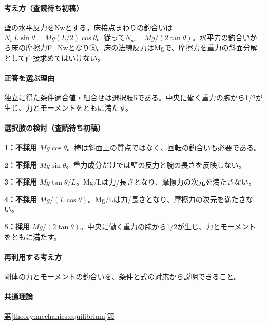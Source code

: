 \paragraph{考え方（査読待ち初稿）} 壁の水平反力をNwとする。床接点まわりの釣合いは\(N_wL\sin\theta=Mg(L/2)\cos\theta\)。従って\(N_w=Mg/(2\tan\theta)\)。水平力の釣合いから床の摩擦力F=\allowbreak{}Nwとなり⑤。床の法線反力はMgで、摩擦力を重力の斜面分解として直接求めてはいけない。

\paragraph{正答を選ぶ理由} 独立に得た条件適合値・組合せは選択肢5である。中央に働く重力の腕から1/2が生じ、力とモーメントをともに満たす。

\paragraph{選択肢の検討（査読待ち初稿）}\mbox{}\par

\noindent\textbf{1：不採用} \(Mg\cos\theta\)。棒は斜面上の質点ではなく、回転の釣合いも必要である。\par

\noindent\textbf{2：不採用} \(Mg\sin\theta\)。重力成分だけでは壁の反力と腕の長さを反映しない。\par

\noindent\textbf{3：不採用} \(Mg\tan\theta/L\)。Mg/Lは力/長さとなり、摩擦力の次元を満たさない。\par

\noindent\textbf{4：不採用} \(Mg/(L\cos\theta)\)。Mg/Lは力/長さとなり、摩擦力の次元を満たさない。\par

\noindent\textbf{5：採用} \(Mg/(2\tan\theta)\)。中央に働く重力の腕から1/2が生じ、力とモーメントをともに満たす。\par

\paragraph{再利用する考え方} 剛体の力とモーメントの釣合いを、条件と式の対応から説明できること。

\paragraph{共通理論} \hyperref[theory:mechanics:equilibrium]{第\ref*{theory:mechanics:equilibrium}節}

